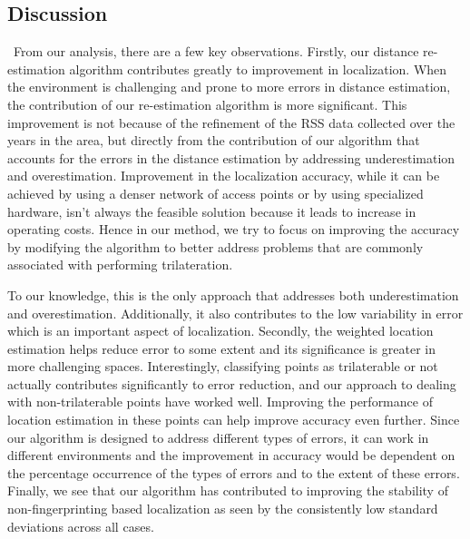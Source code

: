 \documentclass[twocolumn]{svjour3}
\begin{document}
\subsection{\textbf{Discussion}}\
    From our analysis, there are a few key observations. Firstly, our distance re-estimation algorithm contributes greatly to improvement in localization. When the environment is challenging and prone to more errors in distance estimation, the contribution of our re-estimation algorithm is more significant. This improvement is not because of the refinement of the RSS data collected over the years in the area, but directly from the contribution of our algorithm that accounts for the errors in the distance estimation by addressing underestimation and overestimation. 
    Improvement in the localization accuracy, while it can be achieved by using a denser network of access points or by using specialized hardware, isn't always the feasible solution because it leads to increase in operating costs. Hence in our method, we try to focus on improving the accuracy by modifying the algorithm to better address problems that are commonly associated with performing trilateration.
    
    To our knowledge, this is the only approach that addresses both underestimation and overestimation. Additionally, it also contributes to the low variability in error which is an important aspect of localization. Secondly, the weighted location estimation helps reduce error to some extent and its significance is greater in more challenging spaces. Interestingly, classifying points as trilaterable or not actually contributes significantly to error reduction, and our approach to dealing with non-trilaterable points have worked well. Improving the performance of location estimation in these points can help improve accuracy even further. Since our algorithm is designed to address different types of errors, it can work in different environments and the improvement in accuracy would be dependent on the percentage occurrence of the types of errors and to the extent of these errors. Finally, we see that our algorithm has contributed to improving the stability of non-fingerprinting based localization as seen by the consistently low standard deviations across all cases.
    
\end{document}
